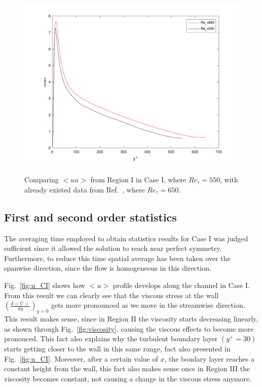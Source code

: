 \documentclass[twocolumn,10pt]{asme2e}
\begin{document}
\begin{figure}[t]
\centering
\scalebox{0.5}
{\includegraphics{comparing_uu.pdf}}
\caption{Comparing \(<uu>\) from Region I in Case I, where \(Re_{\tau}=550\), with already existed data from Ref.~\cite{iwamoto2002}, where \(Re_{\tau}=650\).}
\label{fig:comparing_uu}
\end{figure}

\subsection*{First and second order statistics}

The averaging time employed to obtain statistics results for Case I was judged sufficient since it allowed the solution to reach near perfect symmetry. Furthermore, to reduce this time spatial average has been taken over the spanwise direction, since the flow is homogeneous in this direction.

Fig.~\ref{fig:u_CI}  shows how \(<u>\) profile develops along the channel in Case I. From this result we can clearly see that the viscous stress at the wall \(\left(\frac{d<U>}{dy}\right)_{y=0}\) gets more pronounced as we move in the streamwise direction. This result makes sense, since in Region II the viscosity starts decreasing linearly, as shown through Fig.~\ref{fig:viscosity}, causing the viscous effects to become more pronouced. This fact also explains why the turbulent boundary layer \((y^+=30)\) starts getting closer to the wall in this same range, fact also presented in Fig.~\ref{fig:u_CI}. Moreover, after a certain value of \(x\), the boudary layer reaches a constant height from the wall, this fact also makes sense once in Region III the viscosity becomes constant, not causing a change in the viscous stress anymore.
\end{document}
